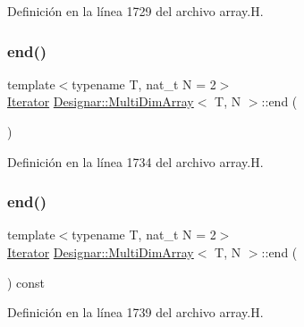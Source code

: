Definición en la línea 1729 del archivo array.\+H.

\mbox{\label{class_designar_1_1_multi_dim_array_a6fc4ca23162a6b285f2a6fd698232459}} 
\subsubsection{\texorpdfstring{end()}{end()}\hspace{0.1cm}{\footnotesize\ttfamily [1/2]}}
{\footnotesize\ttfamily template$<$typename T, nat\+\_\+t N = 2$>$ \\
\hyperlink{class_designar_1_1_multi_dim_array_1_1_iterator}{Iterator} \hyperlink{class_designar_1_1_multi_dim_array}{Designar\+::\+Multi\+Dim\+Array}$<$ T, N $>$\+::end (\begin{DoxyParamCaption}{ }\end{DoxyParamCaption})\hspace{0.3cm}{\ttfamily [inline]}}



Definición en la línea 1734 del archivo array.\+H.

\mbox{\label{class_designar_1_1_multi_dim_array_a83200332e5914f2485d64cedb87b9470}} 
\subsubsection{\texorpdfstring{end()}{end()}\hspace{0.1cm}{\footnotesize\ttfamily [2/2]}}
{\footnotesize\ttfamily template$<$typename T, nat\+\_\+t N = 2$>$ \\
\hyperlink{class_designar_1_1_multi_dim_array_1_1_iterator}{Iterator} \hyperlink{class_designar_1_1_multi_dim_array}{Designar\+::\+Multi\+Dim\+Array}$<$ T, N $>$\+::end (\begin{DoxyParamCaption}{ }\end{DoxyParamCaption}) const\hspace{0.3cm}{\ttfamily [inline]}}



Definición en la línea 1739 del archivo array.\+H.

